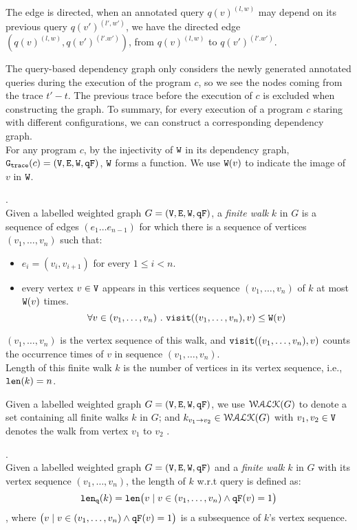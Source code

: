 %
The edge is directed, when an annotated query $q(v)^{(l,w)}$ may depend on its previous query $q(v')^{(l',w')}$, we have the directed
edge $(q(v)^{(l,w)}, q(v')^{(l'.w')})$, from $q(v)^{(l,w)} $ to $q(v')^{(l'.w')}$.

The query-based dependency graph only considers the newly generated annotated queries during the execution of the program $c$, so we see the nodes coming from the trace $t'-t$. The previous trace before the execution of $c$ is excluded when constructing the graph. To summary, for every execution of a program $c$ staring with different configurations, we can construct a corresponding dependency graph. 
\\
For any program $c$, by the injectivity of $\mathtt{W}$ in its dependency graph, $\mathtt{{G_{trace}}}({c}) = (\mathtt{V}, \mathtt{E}, \mathtt{W}, \mathtt{qF})$, 
$\mathtt{W}$ forms a function. We use $\mathtt{W}(v)$ to indicate the image of $v$ in $\mathtt{W}$.
%
\begin{defn}.
\label{def:finitewalk}
\\
Given a labelled weighted graph $G = (\mathtt{V}, \mathtt{E}, \mathtt{W}, \mathtt{qF})$, a \emph{finite walk} $k$ in $G$ is a sequence of edges $(e_1 \ldots e_{n - 1})$ 
for which there is a sequence of vertices $(v_1, \ldots, v_{n})$ such that:
\begin{itemize}
    \item $e_i = (v_{i},v_{i + 1})$ for every $1 \leq i < n$.
    \item every vertex $v \in \mathtt{V}$ appears in this vertices sequence $(v_1, \ldots, v_{n})$ of $k$ at most 
    $\mathtt{W}(v)$ times.  
      \[
        \forall v \in (v_1, \ldots, v_{n})~.~ 
        \mathtt{visit}((v_1, \ldots, v_{n}), v) \leq \mathtt{W}(v)
      \]
\end{itemize}
$(v_1, \ldots, v_{n})$ is the vertex sequence of this walk, and $\mathtt{visit}((v_1, \ldots, v_{n}), v) $ counts the occurrence times of
$v$ in sequence $(v_1, \ldots, v_{n})$.
\\
%
Length of this finite walk $k$ is the number of vertices in its vertex sequence, i.e., $\mathtt{len}(k) = n$.
\end{defn}
%
Given a labelled weighted graph $G = (\mathtt{V}, \mathtt{E}, \mathtt{W}, \mathtt{qF})$, 
we use $\mathcal{WALK}(G)$ to denote a set containing all finite walks $k$ in $G$;
and $k_{v_1 \to v_2} \in \mathcal{WALK}(G)$ with $v_1, v_2 \in \mathtt{V}$ denotes the walk from vertex $v_1$ to $v_2$ .
%
%
\begin{defn}.
\label{def:qlen}
\\
Given a labelled weighted graph $G = (\mathtt{V}, \mathtt{E}, \mathtt{W}, \mathtt{qF})$ and a \emph{finite walk} $k$ in $G$ with its vertex sequence $(v_1, \ldots, v_{n})$, the length of $k$ w.r.t query is defined as:
\[
  \mathtt{len}_{\tt q}(k) = \mathtt{len}\big(
  v \mid v \in (v_1, \ldots, v_{n}) \land \mathtt{qF}(v) = 1 \big)
\]
, where $\big(v \mid v \in (v_1, \ldots, v_{n}) \land \mathtt{qF}(v) = 1 \big)$ is a subsequence of $k$'s vertex sequence.
\end{defn}

